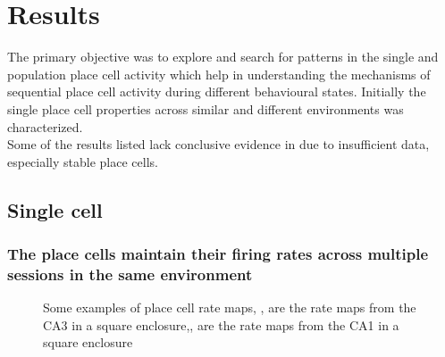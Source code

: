 \chapter{Results}
\label{results}

The primary objective was to explore and search for patterns in the single and population place cell activity which help in understanding the mechanisms of sequential place cell activity during different behavioural states. Initially the single place cell properties across similar and different environments was characterized.  \\
Some of the results listed lack conclusive evidence in due to insufficient data, especially stable place cells. 

\section{Single cell}
\subsection*{The place cells maintain their firing rates across multiple sessions in the same environment}
\begin{figure}[htb!]
\label{fig:ratemaps}
\caption[Rate maps]{Some examples of place cell rate maps, ,  are the rate maps from the CA3 in a square enclosure,,  are the rate maps from the CA1 in a square enclosure}
\end{figure}

